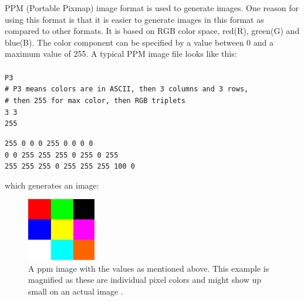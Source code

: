 \documentclass[11pt,a4paper]{article}
\begin{document}
	PPM (Portable Pixmap) image format is used to generate images. One reason for using this format is that it is easier to generate images in this format as compared to other formats. It is based on RGB color space, red(R), green(G) and blue(B). The color component can be specified by a value between 0 and a maximum value of 255. A typical PPM image file looks like this:\\
	\\
	\texttt{P3} \\
	\texttt{\# P3 means colors are in ASCII, then 3 columns and 3 rows,} \\
	\texttt{\# then 255 for max color, then RGB triplets}\\
	\texttt{3 3}\\
	\texttt{255}
	\begin{tabbing}
		\texttt{255 0 0 \hspace*{1.55cm} 0 255 0 \hspace*{1.98cm} 0 0 0}\\
		\texttt{0 0 255 \hspace*{1.55cm} 255 255 0 \hspace*{1.55cm} 255 0 255}\\
		\texttt{255 255 255 \hspace*{0.7cm} 0 255 255 \hspace*{1.53cm} 255 100 0}
	\end{tabbing}
	which generates an image:
	 \begin{figure}[H]
		\centering
		\includegraphics[width=3cm]{ppm_example.png}
		\caption{\centering A ppm image with the values as mentioned above. This example is magnified as these are individual pixel colors and might show up small on an actual image \protect\cite{ppmformat}.}
	 \end{figure}
\end{document}
